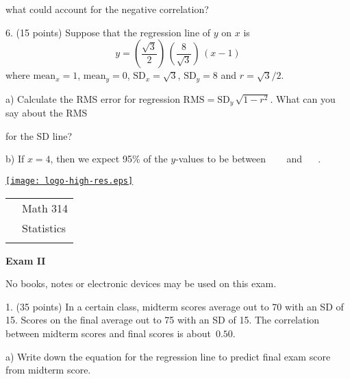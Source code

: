 \documentclass[10pt]{article}
\begin{document}
\hspace{20pt} \hphantom{a) }
what could account for the negative correlation?  
\vfill
\eject


6. (15 points) Suppose that the regression line of $y$ on $x$ 
is \[y=\left(\frac{\sqrt{3}}{2}\right)\,\left(\frac{8}{\sqrt{3}}\right)\,(x-1)\] 
where $\mbox{mean}_x=1$, $\mbox{mean}_y=0$, $\mbox{SD}_x=\sqrt{3}$, $\mbox{SD}_y=8$
and $r=\sqrt{3}/2$.\vspace{3pt}

\hspace{20pt} a) Calculate the RMS error for regression 
$\mbox{RMS}=\mbox{SD}_y\,\sqrt{1-r^2}$.  What can you say about the RMS\vspace{-4pt}

\hspace{20pt}\hphantom{b) } for the SD line?
\vspace{3in}

\hspace{20pt} b) If $x=4$, then we expect 95\% of the $y$-values to be
between \ \underline{\hspace{60pt}} \ \ and \  \underline{\hspace{60pt}} \ .
\vspace{2in}

\vfill
\eject

\href{http://www.shepherd.edu}{\texttt{[image: logo-high-res.eps]}}
\vspace{-1.69cm}

{\small
\begin{tabular}{cl}
& Math 314\\
& Statistics\\
\hspace{5.28in} & %
\end{tabular}
}

\begin{center}
\textbf{\large  Exam II}
\end{center}
No books, notes or electronic devices may be used on this exam.
\medskip

1. (35 points) In a certain class, midterm scores average out to 70 with an SD of 15.  Scores
on the final average out to 75 with an SD of 15.
The correlation between midterm scores and final scores is 
about~$0.50$.   

\hspace{20pt} a) Write down the equation for the regression line to predict final exam score
from midterm score. %
\vspace{1.2in}
\end{document}
